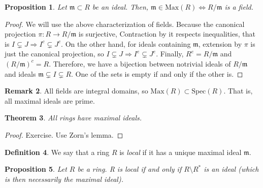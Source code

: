 \documentclass[11pt]{article}
\newtheorem{theorem}{Theorem}[section]
\newtheorem{prop}[theorem]{Proposition}
\theoremstyle{definition}
\newtheorem{defn}[theorem]{Definition}
\newtheorem{rk}[theorem]{Remark}
\begin{document}
        \begin{prop}
            Let $\mathfrak{m} \subset R$ be an ideal.
            Then, $\mathfrak{m} \in \text{Max}(R) \Leftrightarrow R/\mathfrak{m}$ is a field.
        \end{prop}

            \begin{proof}
                We will use the above characterization of fields.
                Because the canonical projection $\pi: R \rightarrow R/\mathfrak{m}$ is surjective,
                Contraction by it respects inequalities, that is $I \subsetneq J \Rightarrow I^c \subsetneq J^c$.
                On the other hand, for ideals containing $\mathfrak{m}$, extension by $\pi$ is just the canonical projection,
                so $I \subsetneq J \Rightarrow I^e \subsetneq J^e$.
                Finally, $R^e = R/\mathfrak{m}$ and $(R/\mathfrak{m})^c = R$.
                Therefore, we have a bijection between notrivial ideals of $R/\mathfrak{m}$
                and ideals $\mathfrak{m} \subsetneq I \subsetneq R$.
                One of the sets is empty if and only if the other is.
            \end{proof}

        \begin{rk}
            All fields are integral domains, so $\text{Max}(R) \subset \text{Spec}(R)$.
            That is, all maximal ideals are prime.
        \end{rk}

        \begin{theorem}
            All rings have maximal ideals.
        \end{theorem}
            \begin{proof}
                Exercise.
                Use Zorn's lemma.
            \end{proof}

        \begin{defn}
            We say that a ring $R$ is \emph{local} if it has a unique maximal ideal $\mathfrak{m}$.
        \end{defn}

        \begin{prop} \label{prop:local}
            Let $R$ be a ring.
            R is local if and only if $R \setminus R^*$ is an ideal (which is then necessarily the maximal ideal).
        \end{prop}
\end{document}
